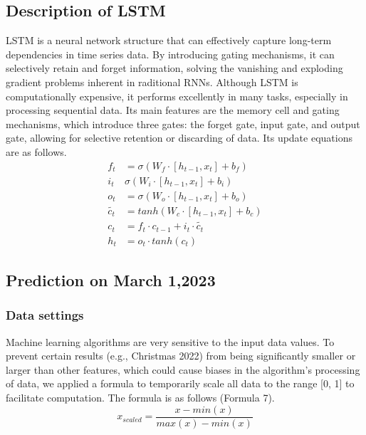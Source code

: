 \documentclass{mcmthesis}  %
\begin{document}
\subsection{Description of LSTM}
LSTM is a neural network structure that can effectively capture long-term dependencies 
in time series data. By introducing gating mechanisms, it can selectively retain and 
forget information, solving the vanishing and exploding gradient problems inherent in 
raditional RNNs. Although LSTM is computationally expensive, it performs excellently in 
many tasks, especially in processing sequential data. Its main features are the memory 
cell and gating mechanisms, which introduce three gates: the forget gate, input gate, 
and output gate, allowing for selective retention or discarding of data. Its update equations 
are as follows.
\begin{equation} 
\begin{aligned}
        f_{t} &=\sigma(W_{f}\cdot [h_{t-1},x_{t}]+b_{f})\\
        i_{t} &\sigma(W_{i}\cdot [h_{t-1},x_{t}]+b_{i}) \\
        o_{t} &=\sigma(W_{o}\cdot [h_{t-1},x_{t}]+b_{o}) \\
        \tilde{c_{t}} &=tanh(W_{c}\cdot [h_{t-1},x_{t}]+b_{c})\\
        c_{t} &=f_{t}\cdot c_{t-1}+i_{t}\cdot \tilde{c_{t}} \\
        h_{t} &=o_{t}\cdot tanh(c_{t})
\end{aligned}
\end{equation} 
       

\subsection{Prediction on March 1,2023}

\subsubsection{Data settings}
Machine learning algorithms are very sensitive to the input data values. To prevent certain results
 (e.g., Christmas 2022) from being significantly smaller or larger than other features, which 
 could cause biases in the algorithm's processing of data, we applied a formula to temporarily 
 scale all data to the range [0, 1] to facilitate computation. The formula is as follows (Formula 7).
 \begin{equation} 
        x_{scaled} =\frac{x-min(x)}{max(x)-min(x)} 
\end{equation} 
\end{document}
